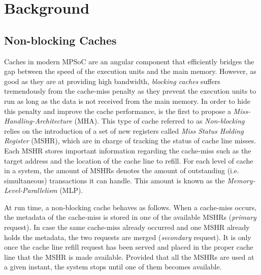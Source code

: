 \section{Background}
    \subsection{Non-blocking Caches}
        Caches in modern MPSoC are an angular component that efficiently bridges the gap between the speed of the execution units and the main memory.
        However, as good as they are at providing high bandwidth, \emph{blocking caches} suffers tremendously from the cache-miss penalty as they prevent the execution units to run as long as the data is not received from the main memory.
        In order to hide this penalty and improve the cache performance, \cite{Kroft} is the first to propose a \emph{Miss-Handling-Architecture} (MHA).
        This type of cache referred to as \emph{Non-blocking} relies on the introduction of a set of new registers called \emph{Miss Status Holding Register} (MSHR), which are in charge of tracking the status of cache line misses.
        Each MSHR stores important information regarding the cache-miss such as the target address and the location of the cache line to refill.
        For each level of cache in a system, the amount of MSHRs denotes the amount of outstanding (i.e. simultaneous) transactions it can handle.
        This amount is known as the \emph{Memory-Level-Parallelism} (MLP).

        At run time, a non-blocking cache behaves as follows. When a cache-miss occurs, the metadata of the cache-miss is stored in one of the available MSHRs (\emph{primary} request). In case the same cache-miss already occurred and one MSHR already holds the metadata, the two requests are merged (\emph{secondary} request). It is only once the cache line refill request has been served and placed in the proper cache line that the MSHR is made available. Provided that all the MSHRs are used at a given instant, the system stops until one of them becomes available.

